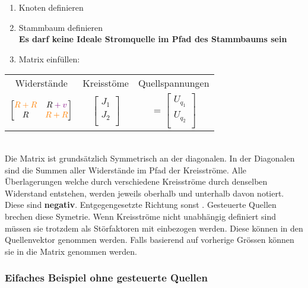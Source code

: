 \begin{enumerate}
    \item Knoten definieren
    \item Stammbaum definieren\\
    {\color{red}\textbf{Es darf keine Ideale Stromquelle im Pfad des Stammbaums sein}}
    \item Matrix einfüllen:
\end{enumerate}

\begin{tabular}{ccc}
    Widerstände & Kreisstöme & Quellspannungen\\
    $\begin{bmatrix} 
        \mathcolor{orange}{R + R} & R \mathcolor{violet}{+ v}\\ 
        R & \mathcolor{orange}{R + R}\\ 
    \end{bmatrix}$
    &
    $\begin{bmatrix}
        J_1\\
        J_2\\
    \end{bmatrix}$
    &
    $=
    \begin{bmatrix}
        U_{q_1}\\
        U_{q_2}\\
    \end{bmatrix}$
    \\
\end{tabular}
\\
Die Matrix ist grundsätzlich Symmetrisch an der diagonalen. 
In der Diagonalen sind die Summen aller Widerstände im Pfad der Kreisströme. 
Alle Überlagerungen welche durch verschiedene Kreisströme durch denselben Widerstand entstehen, werden jeweils oberhalb und unterhalb davon notiert. 
Diese sind \textbf{negativ}. 
Entgegengesetzte Richtung \say{-} sonst \say{+}. 
Gesteuerte Quellen brechen diese Symetrie.
Wenn Kreisströme nicht unabhängig definiert sind müssen sie trotzdem als Störfaktoren mit einbezogen werden. 
Diese können in den Quellenvektor genommen werden. 
Falls basierend auf vorherige Grössen können sie in die Matrix genommen werden.

\subsubsection{Eifaches Beispiel ohne gesteuerte Quellen}

\begin{center}
    
\end{center}

